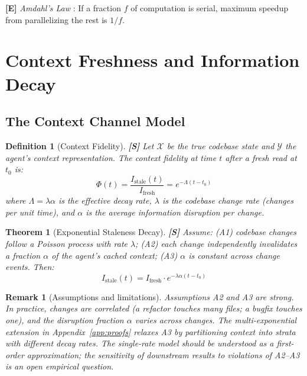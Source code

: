 \documentclass[11pt, a4paper, logo, copyright]{googledeepmind}
\newtheorem{definition}{Definition}[section]
\newtheorem{theorem}{Theorem}[section]
\newtheorem*{remark}{Remark}
\begin{document}
\textbf{[E]} \emph{Amdahl's Law} \citep{amdahl1967validity}: If a fraction $f$ of computation is serial, maximum speedup from parallelizing the rest is $1/f$.


\section{Context Freshness and Information Decay}\label{sec:freshness}

\subsection{The Context Channel Model}

\begin{definition}[Context Fidelity]\label{def:fidelity}
\textbf{[S]} Let $\mathcal{X}$ be the true codebase state and $\mathcal{Y}$ the agent's context representation. The \emph{context fidelity} at time $t$ after a fresh read at $t_0$ is:
\[
    \Phi(t) = \frac{I_{\mathrm{stale}}(t)}{I_{\mathrm{fresh}}} = e^{-\Lambda(t - t_0)}
\]
where $\Lambda = \lambda \alpha$ is the effective decay rate, $\lambda$ is the codebase change rate (changes per unit time), and $\alpha$ is the average information disruption per change.
\end{definition}

\begin{theorem}[Exponential Staleness Decay]\label{thm:staleness}
\textbf{[S]} Assume: (A1) codebase changes follow a Poisson process with rate $\lambda$; (A2) each change independently invalidates a fraction $\alpha$ of the agent's cached context; (A3) $\alpha$ is constant across change events. Then:
\[
    I_{\mathrm{stale}}(t) = I_{\mathrm{fresh}} \cdot e^{-\lambda\alpha(t - t_0)}
\]
\end{theorem}

\begin{remark}[Assumptions and limitations]
Assumptions A2 and A3 are strong. In practice, changes are correlated (a refactor touches many files; a bugfix touches one), and the disruption fraction $\alpha$ varies across changes. The multi-exponential extension in Appendix~\ref{app:proofs} relaxes A3 by partitioning context into strata with different decay rates. The single-rate model should be understood as a first-order approximation; the sensitivity of downstream results to violations of A2--A3 is an open empirical question.
\end{remark}
\end{document}
